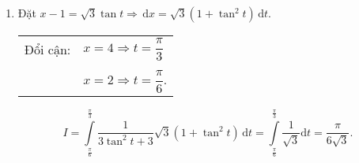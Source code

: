 \begin{bt}
{\begin{enumerate}
		$I= \displaystyle \int \limits_2^{4} \dfrac{1}{x^2-2x+4} \mathrm{d} x =\displaystyle \int \limits_2^{4} \dfrac{1}{(x-1)^2+3} \mathrm{d} x $. 
		\item Đặt $x-1=\sqrt{3} \tan t \Rightarrow \mathrm{\, d}x = \sqrt{3} (1+\tan^2 t)\mathrm{\, d}t$.\\
		\begin{tabular}{ll}
			Đổi cận: \hfill &$x=4 \Rightarrow t = \dfrac{\pi}{3}$ \\ \\
			&$x=2 \Rightarrow t = \dfrac{\pi}{6}$.
		\end{tabular}
		$$I= \displaystyle \int \limits_{\frac{\pi}{6}}^{\frac{\pi}{3}} \dfrac{1}{3\tan^2 t +3}\sqrt{3} (1+\tan^2 t)\mathrm{\, d}t = \displaystyle \int \limits_{\frac{\pi}{6}}^{\frac{\pi}{3}} \dfrac{1}{\sqrt{3}} \mathrm{d}t = \dfrac{\pi}{6\sqrt{3}} .$$
\end{enumerate}
}
\end{bt}
